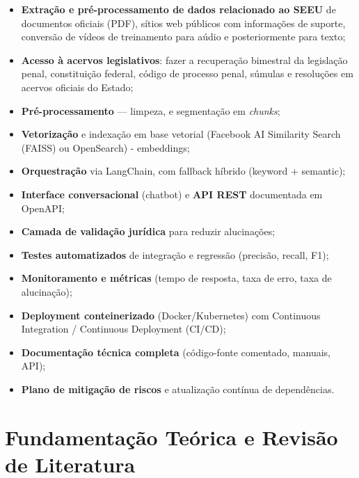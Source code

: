 \begin{itemize}[label=\textbullet]
  \item \textbf{Extração e pré-processamento de dados relacionado ao SEEU} de documentos oficiais (PDF), sítios web públicos com informações de suporte, conversão de vídeos de treinamento para aúdio e posteriormente para texto;
  \item \textbf{Acesso à acervos legislativos}: fazer a recuperação bimestral da legislação penal, constituição federal, código de processo penal, súmulas e resoluções em acervos oficiais do Estado;
  \item \textbf{Pré-processamento} — limpeza,  e segmentação em \emph{chunks};
  \item \textbf{Vetorização} e indexação em base vetorial (Facebook AI Similarity Search (FAISS) ou OpenSearch) - embeddings;
  \item \textbf{Orquestração} via LangChain, com fallback híbrido (keyword + semantic);
  \item \textbf{Interface conversacional} (chatbot) e \textbf{API REST} documentada em OpenAPI;
  \item \textbf{Camada de validação jurídica} para reduzir alucinações;
  \item \textbf{Testes automatizados} de integração e regressão (precisão, recall, F1);
  \item \textbf{Monitoramento e métricas} (tempo de resposta, taxa de erro, taxa de alucinação);
  \item \textbf{Deployment conteinerizado} (Docker/Kubernetes) com Continuous Integration / Continuous Deployment (CI/CD);
  \item \textbf{Documentação técnica completa} (código-fonte comentado, manuais, API);
  \item \textbf{Plano de mitigação de riscos} e atualização contínua de dependências.
\end{itemize}





\chapter{Fundamentação Teórica e Revisão de Literatura}
\label{chap:fundamentacao_literatura}


